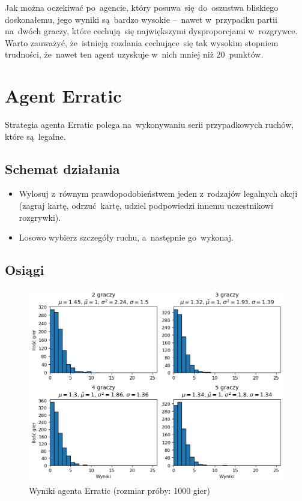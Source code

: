 \documentclass[declaration,shortabstract,inz]{iithesis}
\begin{document}
Jak można oczekiwać po~agencie, który posuwa~się do~oszustwa bliskiego doskonałemu, jego wyniki są~bardzo wysokie --~nawet w~przypadku partii na~dwóch graczy, które cechują~się największymi dysproporcjami w~rozgrywce. Warto zauważyć, że~istnieją rozdania cechujące~się tak wysokim stopniem trudności, że~nawet ten agent uzyskuje w~nich mniej niż 20~punktów.

\section{Agent Erratic}

Strategia agenta Erratic polega na~wykonywaniu serii przypadkowych ruchów, które są~legalne.

\subsection*{Schemat działania}

\begin{itemize}
	\item Wylosuj z~równym prawdopodobieństwem jeden z~rodzajów legalnych akcji (zagraj kartę, odrzuć kartę, udziel podpowiedzi innemu uczestnikowi rozgrywki).
	\item Losowo wybierz szczegóły ruchu, a~następnie go~wykonaj.
\end{itemize}


\subsection*{Osiągi}

\begin{figure}[H]
	\centering
	\captionsetup{format=hang}
	\includegraphics[width=\textwidth,height=\textheight,keepaspectratio]{Erratic.png}
	\caption[Caption]{Wyniki agenta Erratic (rozmiar próby: 1000 gier)}
	\label{fig:Erratic}
\end{figure}
\end{document}
